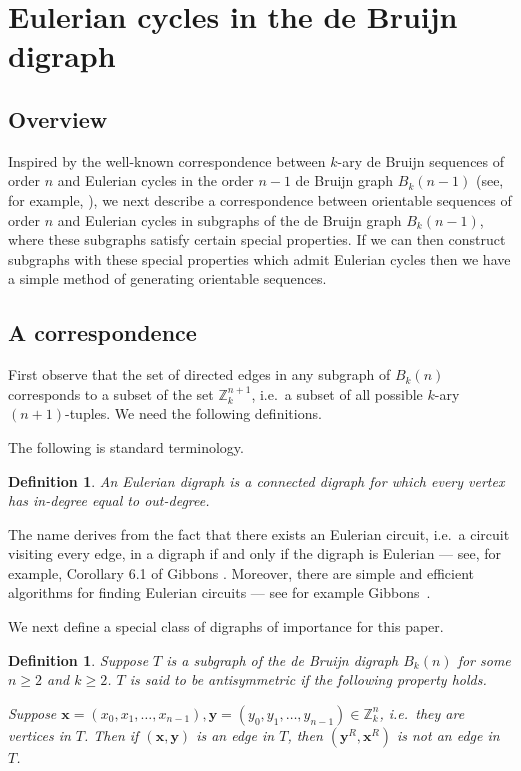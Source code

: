 \documentclass[a4paper,11pt]{article}
\newtheorem{definition}[lemma]{Definition}
\begin{document}
\color{black}

\section{Eulerian cycles in the de Bruijn digraph}  \label{section:Eulerian_cycles}

\subsection{Overview}

Inspired by the well-known correspondence between $k$-ary de Bruijn sequences of order $n$ and
Eulerian cycles in the order $n-1$ de Bruijn graph $B_{k}(n-1)$ (see, for example,
\cite{Lempel70}), we next describe a correspondence between orientable sequences of order $n$ and
Eulerian cycles in subgraphs of the de Bruijn graph $B_{k}(n-1)$, where these subgraphs satisfy
certain special properties.  If we can then construct subgraphs with these special properties which
admit Eulerian cycles then we have a simple method of generating orientable sequences.

\subsection{A correspondence}

First observe that the set of directed edges in any subgraph of $B_{k}(n)$ corresponds to a subset
of the set $\mathbb{Z}_k^{n+1}$, i.e.\ a subset of all possible $k$-ary $(n+1)$-tuples.  We need
the following definitions.

The following is standard terminology.

\begin{definition}  \label{definition;Eulerian}
An \emph{Eulerian digraph} is a connected digraph for which every vertex has in-degree equal to out-degree.
\end{definition}

The name derives from the fact that there exists an Eulerian circuit, i.e.\ a circuit
visiting every edge,  in a digraph if and only if the digraph is Eulerian --- see, for example, Corollary 6.1 of
Gibbons \cite{Gibbons85}.  Moreover, there are simple and efficient algorithms for finding
Eulerian
circuits --- see for example Gibbons~\cite[Figure 6.5]{Gibbons85}.

We next define a special class of digraphs of importance for this paper.

\begin{definition}  \label{definition:antisymmetric}
Suppose $T$ is a subgraph of the de Bruijn digraph $B_{k}(n)$ for some $n\geq2$ and $k\geq2$.  $T$
is said to be \emph{antisymmetric} if the following property holds.

Suppose $\mathbf{x}=(x_0,x_1,\ldots,x_{n-1}),\mathbf{y}=(y_0,y_1,\ldots,y_{n-1})\in
\mathbb{Z}_k^n$, i.e.\ they are vertices in $T$.  Then if $(\mathbf{x},\mathbf{y})$ is an edge in
$T$, then $(\mathbf{y}^R,\mathbf{x}^R)$ is not an edge in $T$.
\end{definition}
\end{document}
